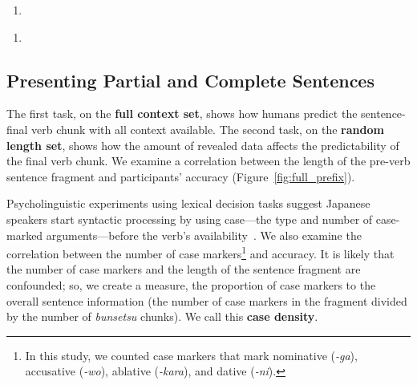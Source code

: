 \begin{enumerate}[(2)]
\listsep
\item \label{sent-ex}

\end{enumerate}
\begin{enumerate}[(3)]
\listsep
\item \label{sent-ex-choices}
\end{enumerate}




\subsection{Presenting Partial and Complete Sentences}


The first task, on the {\bf full context set}, shows how humans
predict the sentence-final verb chunk with all context available.  The
second task, on the {\bf random length set}, shows how the amount of
revealed data affects the predictability of the final verb chunk. We
examine a correlation between the length of the pre-verb sentence
fragment and participants' accuracy (Figure~\ref{fig:full_prefix}).




  Psycholinguistic experiments using lexical decision tasks suggest Japanese
  speakers start syntactic processing by using case---the type and number of
  case-marked arguments---before the verb's availability~\cite{yamashita2000}.
  We also examine the correlation between the number of case markers\footnote{In
    this study, we counted case markers that mark nominative ({\it -ga}),
    accusative ({\it -wo}), ablative ({\it -kara}), and dative ({\it -ni}).}
  and accuracy.  It is likely that the number of case markers and the length of
  the sentence fragment are confounded; so, we create a measure, the proportion
  of case markers to the overall sentence information (the number of case
  markers in the fragment divided by the number of {\it bunsetsu} chunks). We
  call this \textbf{case density}.


